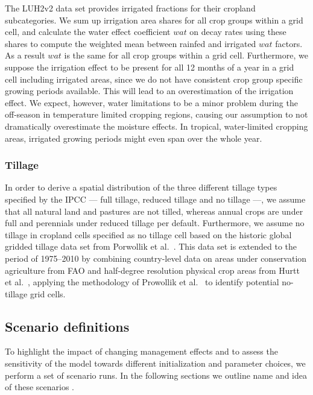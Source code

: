 \documentclass[gc, manuscript]{copernicus}
\begin{document}
The LUH2v2 \citep{hurtt_harmonization_2020} data set provides irrigated fractions for their cropland subcategories. We sum up irrigation area shares for all crop groups within a grid cell, and calculate the water effect coefficient \(wat\) on decay rates using these shares to compute the weighted mean between rainfed and irrigated \(wat\) factors. As a result \(wat\) is the same for all crop groups within a grid cell. Furthermore, we suppose the irrigation effect to be present for all 12 months of a year in a grid cell including irrigated areas, since we do not have consistent crop group specific growing periods available. This will lead to an overestimation of the irrigation effect. We expect, however, water limitations to be a minor problem during the off-season in temperature limited cropping regions, causing our assumption to not dramatically overestimate the moisture effects. In tropical, water-limited cropping areas, irrigated growing periods might even span over the whole year.

\hypertarget{sec:tillage}{%
\subsubsection{Tillage}\label{sec:tillage}}

In order to derive a spatial distribution of the three different tillage types specified by the IPCC --- full tillage, reduced tillage and no tillage ---, we assume that all natural land and pastures are not tilled, whereas annual crops are under full and perennials under reduced tillage per default. Furthermore, we assume no tillage in cropland cells specified as no tillage cell based on the historic global gridded tillage data set from Porwollik et al.~\citeyearpar{porwollik_generating_2018}. This data set is extended to the period of 1975--2010 by combining country-level data on areas under conservation agriculture from FAO \citeyearpar{fao_aquastat_2016} and half-degree resolution physical crop areas from Hurtt et al.~\citeyearpar{hurtt_harmonization_2020}, applying the methodology of Prowollik et al.~\citeyearpar{porwollik_generating_2018} to identify potential no-tillage grid cells.

\hypertarget{sec:scenarios}{%
\subsection{Scenario definitions}\label{sec:scenarios}}

To highlight the impact of changing management effects and to assess the sensitivity of the model towards different initialization and parameter choices, we perform a set of scenario runs. In the following sections we outline name and idea of these scenarios \citep[for technical implementation see][]{karstens_mrsoil_2020}.
\end{document}
